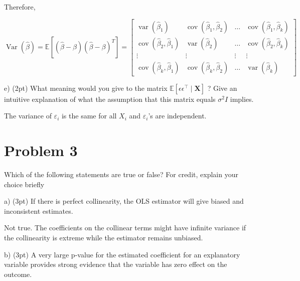 \documentclass{article}\usepackage[]{graphicx}\usepackage[]{color}
\begin{document}
Therefore, 

$\operatorname{Var}(\hat{\beta}) = 
\mathbb{E}\left[(\hat{\beta}-\beta)(\hat{\beta}-\beta)^{T}\right] 
= \left[\begin{array}{cccc}
\operatorname{var}\left(\hat{\beta}_{1}\right) & \operatorname{cov}\left(\hat{\beta}_{1}, \hat{\beta}_{2}\right) & \ldots & \operatorname{cov}\left(\hat{\beta}_{1}, \hat{\beta}_{k}\right) \\
\operatorname{cov}\left(\hat{\beta}_{2}, \hat{\beta}_{1}\right) & \operatorname{var}\left(\hat{\beta}_{2}\right) & \ldots & \operatorname{cov}\left(\hat{\beta}_{2}, \hat{\beta}_{k}\right) \\
\vdots & \vdots & \vdots & \vdots \\
\operatorname{cov}\left(\hat{\beta}_{k}, \hat{\beta}_{1}\right) & \operatorname{cov}\left(\hat{\beta}_{k}, \hat{\beta}_{2}\right) & \ldots & \operatorname{var}\left(\hat{\beta}_{k}\right)
\end{array}\right]
$
\vspace*{0.5cm}

e) (2pt) What meaning would you give to the matrix $\mathbb{E}\left[\epsilon \epsilon^{\top} \mid \mathbf{X}\right]$ ? Give an intuitive explanation of what the assumption that this matrix equals $\sigma^{2} I$ implies.

\vspace*{0.5cm}
The variance of $\varepsilon_i$ is the same for all $X_i$ and $\varepsilon_i$'s are independent. 
\vspace*{0.5cm}


\section*{Problem 3}

Which of the following statements are true or false? For credit, explain your choice briefly

a) (3pt) If there is perfect collinearity, the OLS estimator will give biased and inconsistent estimates.

\vspace*{0.5cm}
Not true. The coefficients on the collinear terms might have infinite variance if the collinearity is extreme while the estimator remains unbiased. 
\vspace*{0.5cm}

b) (3pt) A very large p-value for the estimated coefficient for an explanatory variable provides strong evidence that the variable has zero effect on the outcome.
\end{document}
